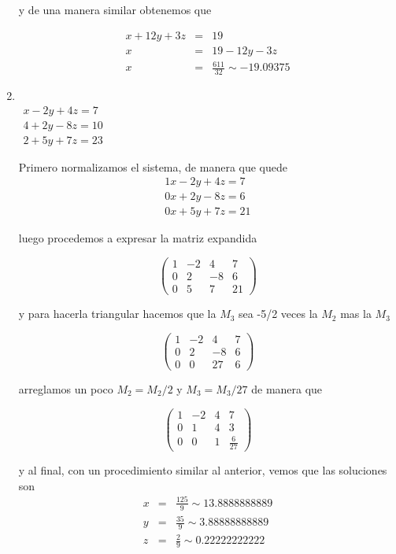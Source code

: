 \documentclass[11pt]{article}
\begin{document}
\begin{multicols}{2}
\begin{enumerate}[\bf{Sistema} 1]
			y de una manera similar obtenemos que 
			
			\begin{eqnarray*}
				x + 12y + 3z &=& 19 \\
				x &=& 19 - 12y - 3z \\
				x &=& \frac{611}{32} \sim -19.09375
			\end{eqnarray*}
			
			
			
		\item
			\ \\ $\begin{matrix}
				x - 2y + 4z =  7 \\
				4 + 2y - 8z = 10 \\
				2 + 5y + 7z = 23
			\end{matrix}$
			
			\par Primero normalizamos el sistema, de manera que quede		
			$$\begin{matrix}
				1x - 2y + 4z =  7 \\
				0x + 2y - 8z =  6 \\
				0x + 5y + 7z = 21
			\end{matrix}$$
			
			luego procedemos a expresar la matriz expandida
			
			$$\left(\begin{array}{rrrr}
				1 & -2 & 4 & 7 \\
				0 & 2 & -8 & 6 \\
				0 & 5 & 7 & 21
			\end{array}\right)$$
			
			y para hacerla triangular hacemos que la $M_3$ sea -5/2 veces la $M_2$ mas la $M_3$
			
			$$\left(\begin{array}{rrrr}
				1 & -2 & 4 & 7 \\
				0 & 2 & -8 & 6 \\
				0 & 0 & 27 & 6
			\end{array}\right)$$
			
			arreglamos un poco $M_2 = M_2/2$ y $M_3 = M_3/27$ de manera que
			
			$$\left(\begin{array}{rrrr}
				1 & -2 & 4 & 7 \\
				0 & 1 & 4 & 3 \\
				0 & 0 & 1 & \frac{6}{27}
			\end{array}\right)$$
			
			 y al final, con un procedimiento similar al anterior, vemos que las soluciones son
			 \begin{eqnarray*}
			 	x &=& \frac{125}{9} \sim 13.8888888889\\
			 	y &=& \frac{35}{9} \sim 3.88888888889\\
			 	z &=& \frac{2}{9} \sim 0.22222222222
			 \end{eqnarray*}
			
	\end{enumerate}
\end{multicols}
\end{document}
